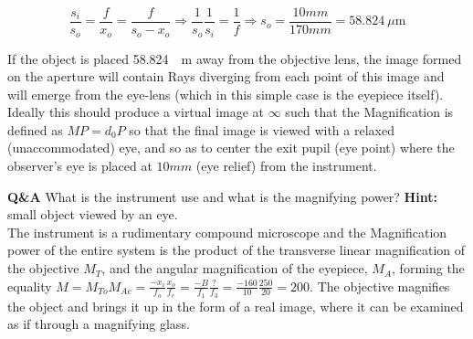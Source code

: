 \documentclass[main.tex]{subfiles}
\begin{document}
\begin{equation}
\frac{s_i}{s_o} = \frac{f}{x_o} = \frac{f}{s_o - x_o} \Rightarrow \frac{1}{s_o} \frac{1}{s_i} = \frac{1}{f} \Rightarrow s_o = \frac{10mm}{170mm} = \SI{58.824}{\mu \meter} 
\end{equation}


If the object is placed \SI{58.824}{\mu \meter} away from the objective lens, the image formed on the aperture will contain Rays diverging from each point of this image and will emerge from the eye-lens (which in this simple case is the eyepiece itself).\\ 


Ideally this should produce a virtual image at $\infty$ such that the Magnification is defined as $MP=d_0P$ so that the final image is viewed with a relaxed (unaccommodated) eye, and so as to center the exit pupil (eye point) where the observer's eye is placed at $10mm$ (eye relief) from the instrument.\\

\fi

\textbf{Q\&A} What is the instrument use and what is the magnifying power? \textbf{Hint:} small object viewed by an eye.\\

The instrument is a rudimentary compound microscope and the Magnification power of the entire system is the product of the transverse linear magnification of the objective $M_T$, and the angular magnification of the eyepiece, $M_A$, forming the equality $M = M_{To} M_{Ae} = \frac{-x_i}{f_o} \frac{x_o}{f_e} = \frac{-B}{f_1} \frac{?}{f_3} = \frac{-160}{10} \frac{250}{20} = 200$. The objective magnifies the object and brings it up in the form of a real image, where it can be examined as if through a magnifying glass.

\end{document}
